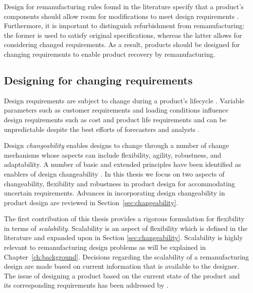 Design for remanufacturing rules found in the literature specify that a product's components should allow room for modifications to meet design requirements \cite{Ijomah2009}. Furthermore, it is important to distinguish refurbishment from remanufacturing: the former is used to satisfy original specifications, whereas the latter allows for considering changed requirements. As a result, products should be designed for changing requirements to enable product recovery by remanufacturing.

\subsection{Designing for changing requirements} \label{subsec:changingreq}

Design requirements are subject to change during a product's lifecycle \cite{Goodall2014,Lindahl2007,Thierry2012,American2017}. Variable parameters such as customer requirements and loading conditions influence des\-ign requirements such as cost and product life requirements \cite{Fricke2005} and can be unpredictable despite the best efforts of forecasters and analysts \cite{DeNeufville2011}.

Design \textit{changeability} enables designs to change through a number of change mechanisms whose aspects can include flexibility, agility, robustness, and adaptability. A number of basic and extended principles have been identified as enablers of design changeability \cite{Fricke2005}. In this thesis we focus on two aspects of changeability, flexibility and robustness in product design for accommodating uncertain requirements. Advances in incorporating design changeability in product design are reviewed in Section~\ref{sec:changeability}.

The first contribution of this thesis provides a rigorous formulation for flexibility in terms of \textit{scalability}. Scalability is an aspect of flexibility which is defined in the literature and expanded upon in Section \ref{sec:changeability}. Scalability is highly relevant to remanufacturing design problems as will be explained in Chapter~\ref{ch:background}. Decisions regarding the scalability of a remanufacturing design are made based on current information that is available to the designer. The issue of designing a product based on the current state of the product and its corresponding requirements has been addressed by \citeauthor{Alhandawi2020} \cite{Alhandawi2020}.

